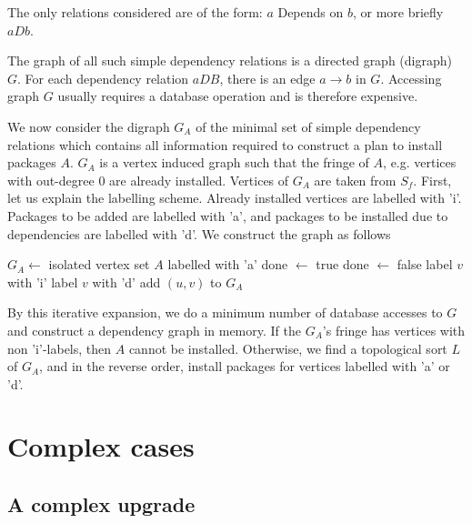 \documentclass[a4paper,11pt]{article}
\begin{document}
The only relations considered are of the form: $a$ Depends on $b$, or more
briefly $aDb$.

The graph of all such simple dependency relations is a directed graph
(digraph) $G$. For each dependency relation $aDB$, there is an edge $a
\to b$ in $G$. Accessing graph $G$ usually requires a database operation and
is therefore expensive.

We now consider the digraph $G_A$ of the minimal set of simple
dependency relations which contains all information required to
construct a plan to install packages $A$. $G_A$ is a vertex induced graph
such that the fringe of $A$, e.g. vertices with out-degree $0$ are
already installed. Vertices of $G_A$ are taken from $S_f$. First, let us
explain the labelling scheme. Already installed vertices are labelled
with 'i'. Packages to be added are labelled with 'a', and packages to
be installed due to dependencies are labelled with 'd'. We
construct the graph as follows
\begin{algorithm}
  \label{alg:cons-graph}
  \begin{algorithmic}[1]
\STATE $G_A \gets$ isolated vertex set $A$ labelled with 'a'
\REPEAT
  \STATE done $\gets$ true
        \STATE done $\gets$ false
          \STATE label $v$ with 'i'
        \ELSE
          \STATE label $v$ with 'd'
        \ENDIF
        \STATE add $(u,v)$ to $G_A$
       \ENDIF
     \ENDFOR
  \ENDFOR
{}
\end{algorithmic}
\end{algorithm}

By this iterative expansion, we do a minimum number of database
accesses to $G$ and construct a dependency graph in memory. If the
$G_A$'s fringe has vertices with non 'i'-labels, then $A$ cannot be
installed. Otherwise, we find a topological sort $L$ of $G_A$, and in
the reverse order, install packages for vertices labelled with
'a' or 'd'.

\section{Complex cases}

\subsection{A complex upgrade}
\end{document}

